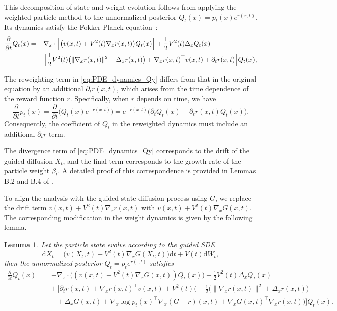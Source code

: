 \documentclass{article}
\theoremstyle{plain}
\newtheorem{lemma}[theorem]{Lemma}
\theoremstyle{definition}
\theoremstyle{remark}
\newcommand{\dif}{{\mathrm{d}}}
\begin{document}
This decomposition of state and weight evolution follows from applying the weighted particle method to the unnormalized posterior \(Q_t(x)=p_t(x)e^{r(x,t)}\). Its dynamics satisfy the Fokker-Planck equation~\citep[Lemma B.1]{chen2025solving}:
\begin{align}
\frac{\partial}{\partial t} Q_t(x)
&= -\nabla_x\cdot\Bigl[\bigl(v(x,t)+V^2(t)\nabla_x r(x,t)\bigr) Q_t(x)\Bigr]
    + \frac{1}{2}V^2(t)\Delta_x Q_t(x) \nonumber\\
&\quad + \Bigl[\frac{1}{2}V^2(t)\bigl(\|\nabla_x r(x,t)\|^2+\Delta_x r(x,t)\bigr)
    + \nabla_x r(x,t)^\top v(x,t) + \partial_t r(x,t)\Bigr] Q_t(x),
\label{eq:PDE_dynamics_Qy}
\end{align}

The reweighting term in \eqref{eq:PDE_dynamics_Qy} differs from that in the original equation by an additional $\partial_t r(x,t)$, which arises from the time dependence of the reward function $r$. Specifically, when $r$ depends on time, we have
\[
\frac{\partial}{\partial t} p_t(x)
= \frac{\partial}{\partial t}\bigl(Q_t(x) e^{-r(x,t)}\bigr)
= e^{-r(x,t)}\bigl(\partial_t Q_t(x) - \partial_t r(x,t) Q_t(x)\bigr).
\]
Consequently, the coefficient of $Q_t$ in the reweighted dynamics must include an additional $\partial_t r$ term.

The divergence term of \eqref{eq:PDE_dynamics_Qy} corresponds to the drift of the guided diffusion $X_t$, and the final term corresponds to the growth rate of the particle weight $\beta_t$. A detailed proof of this correspondence is provided in Lemmas B.2 and B.4 of \cite{chen2025solving}.

To align the analysis with the guided state diffusion process using $G$, we replace the drift term $v(x,t)+V^2(t)\nabla_x r(x,t)$ with $v(x,t)+V^2(t)\nabla_x G(x,t)$. The corresponding modification in the weight dynamics is given by the following lemma.

\begin{lemma}
Let the particle state evolve according to the guided SDE \[\dif X_t = \bigl(v(X_t,t) + V^2(t)\nabla_x G(X_t,t)\bigr) \dif t + V(t) \dif W_t,\] then the unnormalized posterior \(Q_t = p_t e^{r(\cdot, t)}\) satisfies
\[
    \begin{aligned}
        \frac{\partial}{\partial t} Q_t(x)
        &= -\nabla_x\cdot\bigl((v(x,t)+V^2(t)\nabla_x G(x,t))Q_t(x)\bigr)
           + \frac{1}{2}V^2(t)\Delta_x Q_t(x) \\
        &\quad + \Bigg[
            \partial_t r(x,t)
           +\nabla_x r(x,t)^\top v(x,t)
           + V^2(t)\Big(
              -\frac{1}{2}\big(\|\nabla_x r(x,t)\|^2+\Delta_x r(x,t)\big)\\
        &\qquad
              + \Delta_x G(x,t) 
              + \nabla_x \log p_t(x)^\top \nabla_x(G-r)(x,t)
              + \nabla_x G(x,t)^\top \nabla_x r(x,t)
           \Big)
        \Bigg] Q_t(x).
    \end{aligned}
\]
\end{lemma}
\end{document}
